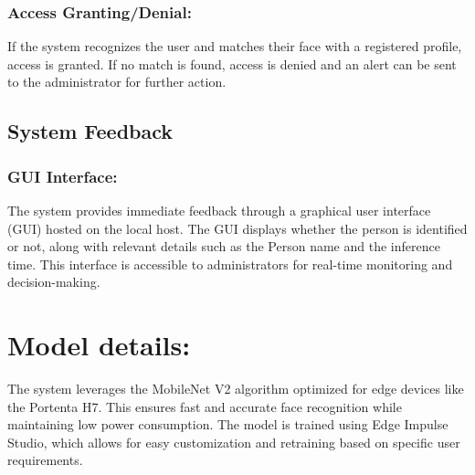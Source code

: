 \subsubsection{Access Granting/Denial:} 
If the system recognizes the user and matches their face with a registered profile, access is granted. If no match is found, access is denied and an alert can be sent to the administrator for further action.

\subsection{System Feedback}

\subsubsection{GUI Interface:} 
The system provides immediate feedback through a graphical user interface (GUI) hosted on the local host. The GUI displays whether the person is identified or not, along with relevant details such as the Person name and the inference time. This interface is accessible to administrators for real-time monitoring and decision-making.

\section{Model details:}
The system leverages the MobileNet V2 algorithm optimized for edge devices like the Portenta H7. This ensures fast and accurate face recognition while maintaining low power consumption. The model is trained using Edge Impulse Studio, which allows for easy customization and retraining based on specific user requirements.